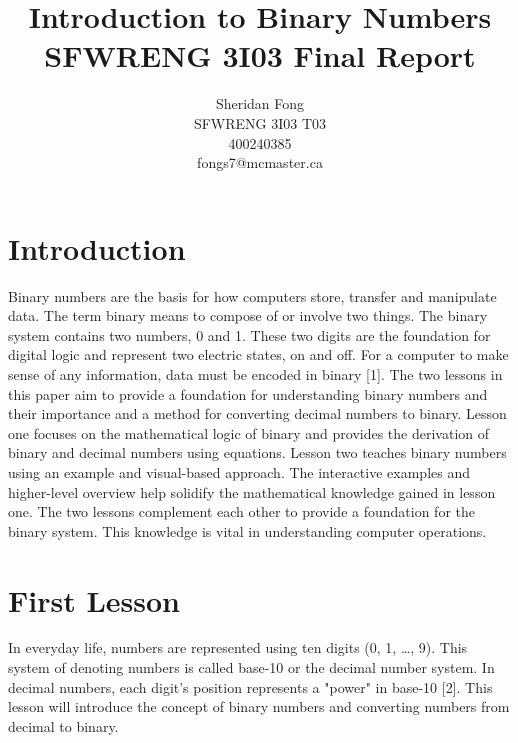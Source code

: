 \documentclass[twocolumn, 10pt]{article}
\title{Introduction to Binary Numbers \\ \large SFWRENG 3I03 Final Report}
\author{Sheridan Fong\\ SFWRENG 3I03 T03 \\ 400240385 \\ fongs7@mcmaster.ca }
\begin{document}


\maketitle
{}
\section{Introduction}\label{sec:intro}
Binary numbers are the basis for how computers store, transfer and manipulate data. The term binary means to compose of or involve two things. The binary system contains two numbers, 0 and 1. These two digits are the foundation for digital logic and represent two electric states, on and off. For a computer to make sense of any information, data must be encoded in binary [1]. The two lessons in this paper aim to provide a foundation for understanding binary numbers and their importance and a method for converting decimal numbers to binary. Lesson one focuses on the mathematical logic of binary and provides the derivation of binary and decimal numbers using equations. Lesson two teaches binary numbers using an example and visual-based approach. The interactive examples and higher-level overview help solidify the mathematical knowledge gained in lesson one. The two lessons complement each other to provide a foundation for the binary system. This knowledge is vital in understanding computer operations. 

\section{First Lesson} 
In everyday life, numbers are represented using ten digits (0, 1, …, 9). This system of denoting numbers is called base-10 or the decimal number system. In decimal numbers, each digit's position represents a "power" in base-10 [2]. This lesson will introduce the concept of binary numbers and converting numbers from decimal to binary.
\end{document}
